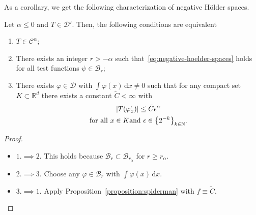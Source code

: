 As a corollary, we get the following characterization of negative Hölder spaces.

\begin{corollary}
  Let \( \alpha \leq 0 \) and \( T \in \mathcal{D}' \). Then, the following conditions are equivalent 
  \begin{enumerate}
    \item \( T \in \mathcal{C}^\alpha \);
    \item There exists an integer \( r > - \alpha \) such that~\eqref{eq:negative-hoelder-spaces} holds for all test functions \( \psi \in \mathcal{B}_r \);
    \item There exists \( \varphi \in \mathcal{D} \) with \( \int \varphi(x) \, \mathrm{d}x  \neq 0 \) such that for any compact set \( K \subset \mathbb{R}^d \) there exists a constant \( \tilde C < \infty \) with 
    \begin{gather*}
      |T(\varphi^\epsilon_x)| \leq \tilde C \epsilon^\alpha \\
      \text{for all \( x \in K \)and \( \epsilon \in \left\{ 2^{-k} \right\}_{k \in \mathbb{N}} \)}.
    \end{gather*}
  \end{enumerate}
\end{corollary}

\begin{proof}\(  \)

  \begin{itemize}
    \item \( 1. \implies 2. \) This holds because \( \mathcal{B}_r \subset \mathcal{B}_{r_\alpha} \) for \( r \geq r_\alpha \).
    \item \( 2. \implies 3. \) Choose any \( \varphi \in \mathcal{B}_{r} \) with \( \int \varphi(x) \, \mathrm{d}x \).
    \item \( 3. \implies 1. \) Apply Proposition~\ref{proposition:spiderman} with \( f \equiv \tilde C \).
  \end{itemize}
\end{proof}